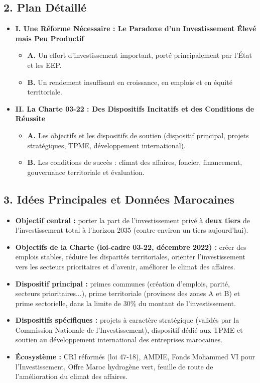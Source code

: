 \subsection*{2. Plan Détaillé}
\begin{itemize}
    \item \textbf{I. Une Réforme Nécessaire : Le Paradoxe d'un Investissement Élevé mais Peu Productif}
    \begin{itemize}
        \item \textbf{A.} Un effort d'investissement important, porté principalement par l'État et les EEP.
        \item \textbf{B.} Un rendement insuffisant en croissance, en emplois et en équité territoriale.
    \end{itemize}
    \item \textbf{II. La Charte 03-22 : Des Dispositifs Incitatifs et des Conditions de Réussite}
    \begin{itemize}
        \item \textbf{A.} Les objectifs et les dispositifs de soutien (dispositif principal, projets stratégiques, TPME, développement international).
        \item \textbf{B.} Les conditions de succès : climat des affaires, foncier, financement, gouvernance territoriale et évaluation.
    \end{itemize}
\end{itemize}

\subsection*{3. Idées Principales et Données Marocaines}
\begin{itemize}
    \item \textbf{Objectif central :} porter la part de l'investissement privé à \textbf{deux tiers} de l'investissement total à l'horizon 2035 (contre environ un tiers aujourd'hui).
    \item \textbf{Objectifs de la Charte (loi-cadre 03-22, décembre 2022) :} créer des emplois stables, réduire les disparités territoriales, orienter l'investissement vers les secteurs prioritaires et d'avenir, améliorer le climat des affaires.
    \item \textbf{Dispositif principal :} primes communes (création d'emplois, parité, secteurs prioritaires...), prime territoriale (provinces des zones A et B) et prime sectorielle, dans la limite de 30\% du montant de l'investissement.
    \item \textbf{Dispositifs spécifiques :} projets à caractère stratégique (validés par la Commission Nationale de l'Investissement), dispositif dédié aux TPME et soutien au développement international des entreprises marocaines.
    \item \textbf{Écosystème :} CRI réformés (loi 47-18), AMDIE, Fonds Mohammed VI pour l'Investissement, Offre Maroc hydrogène vert, feuille de route de l'amélioration du climat des affaires.
\end{itemize}

